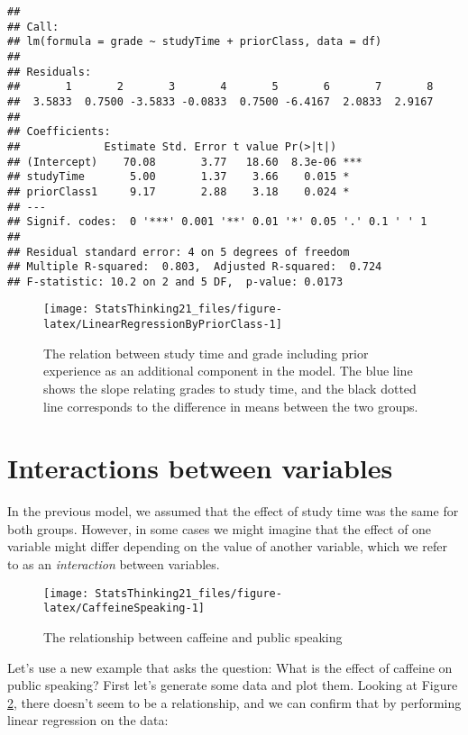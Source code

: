 \documentclass[]{book}
\theoremstyle{definition}
\theoremstyle{definition}
\theoremstyle{definition}
\theoremstyle{remark}
\begin{document}
\begin{verbatim}
## 
## Call:
## lm(formula = grade ~ studyTime + priorClass, data = df)
## 
## Residuals:
##       1       2       3       4       5       6       7       8 
##  3.5833  0.7500 -3.5833 -0.0833  0.7500 -6.4167  2.0833  2.9167 
## 
## Coefficients:
##             Estimate Std. Error t value Pr(>|t|)    
## (Intercept)    70.08       3.77   18.60  8.3e-06 ***
## studyTime       5.00       1.37    3.66    0.015 *  
## priorClass1     9.17       2.88    3.18    0.024 *  
## ---
## Signif. codes:  0 '***' 0.001 '**' 0.01 '*' 0.05 '.' 0.1 ' ' 1
## 
## Residual standard error: 4 on 5 degrees of freedom
## Multiple R-squared:  0.803,  Adjusted R-squared:  0.724 
## F-statistic: 10.2 on 2 and 5 DF,  p-value: 0.0173
\end{verbatim}

\begin{figure}
\texttt{[image: StatsThinking21\_files/figure-latex/LinearRegressionByPriorClass-1]} \caption{The relation between study time and grade including prior experience as an additional component in the model.  The blue line shows the slope relating grades to study time, and the black dotted line corresponds to the difference in means between the two groups.}\label{fig:LinearRegressionByPriorClass}
\end{figure}

\section{Interactions between
variables}\label{interactions-between-variables}

In the previous model, we assumed that the effect of study time was the
same for both groups. However, in some cases we might imagine that the
effect of one variable might differ depending on the value of another
variable, which we refer to as an \emph{interaction} between variables.

\begin{figure}
\texttt{[image: StatsThinking21\_files/figure-latex/CaffeineSpeaking-1]} \caption{The relationship between caffeine and public speaking}\label{fig:CaffeineSpeaking}
\end{figure}

Let's use a new example that asks the question: What is the effect of
caffeine on public speaking? First let's generate some data and plot
them. Looking at Figure \ref{fig:CaffeineSpeaking}, there doesn't seem
to be a relationship, and we can confirm that by performing linear
regression on the data:
\end{document}
